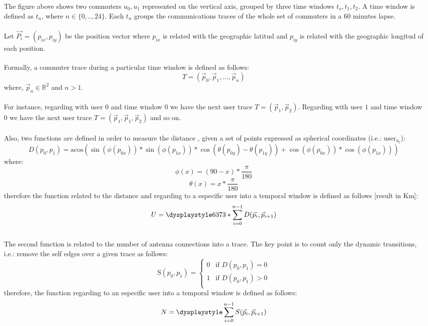 The figure above shows two commuters ${u_0,u_1}$ represented on the vertical axis, grouped by three time windows $t_o,t_1,t_2$. A time window is defined as $t_n$, where $n \in \{0,..,24\}$. Each $t_n$ groups the communications traces of the whole set of commuters in a 60 minutes lapse. 
\\
\\
Let $\vec{P_i} = (p_{ix}, p_{iy})$ be the position vector where $p_{ix}$ is related with the geographic latitud and $p_{iy}$ is related with the geographic longitud of each position.
\\
\\
Formally, a commuter trace during a particular time window is defined as follows:
$$ T = (\vec{p}_0, \vec{p}_1, ..., \vec{p}_n)  $$ where, 
$\vec{p}_n \in \mathbb{R}^2$ and $n > 1 $.
\\
\\
For instance, regarding with user $0$ and time window $0$ we have the next user trace $ T = (\vec{p}_1, \vec{p}_2)  $. Regarding with user $1$ and time window $0$ we have the next user trace $ T = (\vec{p}_1, \vec{p}_1, \vec{p}_2)  $ and so on.
\\
\\
Also, two functions are defined in order to measure the distance \citep{distance}, given a set of points expressed as spherical coordinates (i.e.: $\text{user}_u_t$):
$$D(p_0, p_1) = \text{acos}( \sin(\phi(p_{0x})) * \sin(\phi(p_{1x})) * \cos(\theta(p_{0y}) - \theta(p_{1y})) + \cos(\phi(p_{0x})) * \cos(\phi(p_{1x})))  $$
where:
$$ \phi(x) = (90 - x) * \frac{\pi}{180}$$
$$ \theta(x) = x  * \frac{\pi}{180}$$
therefore the function related to the distance and regarding to a especific user into a temporal window is defined as follows [result in Km]:
$$U = \dysplaystyle 6373 * \sum_{i=0}^{n-1} D(\vec{p}_i, \vec{p}_{i+1}) $$
\\
The second function is related to the number of antenna connections into a trace. The key point is to count only the dynamic transitions, i.e.: remove the self edges over a given trace as follows:
\\
\begin{equation*}
\text{S}(p_0, p_1) = \left \{
\begin{matrix}
0 & \text{if } D(p_0, p_1) = 0 \\
1 & \text{if } D(p_0, p_1) > 0 \\
\end{matrix} \right.
\end{equation*}
therefore, the function regarding to an especific user into a temporal window is defined as follows:
$$N = \dysplaystyle \sum_{i=0}^{n-1} S(\vec{p}_i, \vec{p}_{i+1})$$
